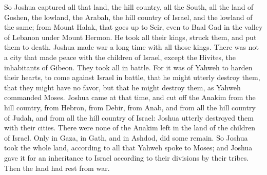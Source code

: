 {So Joshua captured all that land, the hill country, all the South, all the land of Goshen, the lowland, the Arabah, the hill country of Israel, and the lowland of the same;
from Mount Halak, that goes up to Seir, even to Baal Gad in the valley of Lebanon under Mount Hermon. He took all their kings, struck them, and put them to death.
Joshua made war a long time with all those kings.
There was not a city that made peace with the children of Israel, except the Hivites, the inhabitants of Gibeon. They took all in battle.
For it was of Yahweh to harden their hearts, to come against Israel in battle, that he might utterly destroy them, that they might have no favor, but that he might destroy them, as Yahweh commanded Moses.
Joshua came at that time, and cut off the Anakim from the hill country, from Hebron, from Debir, from Anab, and from all the hill country of Judah, and from all the hill country of Israel: Joshua utterly destroyed them with their cities.
There were none of the Anakim left in the land of the children of Israel. Only in Gaza, in Gath, and in Ashdod, did some remain.
So Joshua took the whole land, according to all that Yahweh spoke to Moses; and Joshua gave it for an inheritance to Israel according to their divisions by their tribes. Then the land had rest from war.

}
